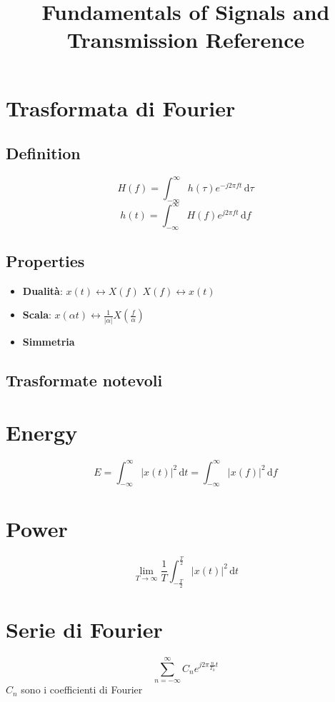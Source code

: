 \documentclass[12pt,a4paper,]{article}
\title{Fundamentals of Signals and Transmission Reference}
\date{}
\author{}
\begin{document}
\maketitle
\section{Trasformata di Fourier}
\subsection{Definition}
\begin{equation}
H(f) = \int_{-\infty}^{\infty} \! h(\tau) e^{-j2\pi ft} \, \mathrm{d}\tau
\end{equation}
\begin{equation}
h(t) = \int_{-\infty}^{\infty} \! H(f) e^{j2\pi ft} \, \mathrm{d}f
\end{equation}
\subsection{Properties}
 \begin{itemize}
 \item  \textbf{Dualità}: $ x(t) \longleftrightarrow X(f)$ $ X(f)\longleftrightarrow x(t)$
 \item \textbf{Scala}: $ x(\alpha t)  \longleftrightarrow \frac{1}{|\alpha|}X(\frac{f}{\alpha})$
 \item \textbf{Simmetria}
  \end{itemize}
 \subsection{Trasformate notevoli}
\section{Energy}
\begin{equation}
E= \int_{-\infty}^{\infty} \! |x(t)|^{2}\, \mathrm{d}t = \int_{-\infty}^{\infty} \! |x(f)|^{2}\, \mathrm{d}f
\end{equation}
\section{Power}
\begin{equation}
\lim_{T\to\infty} \frac{1}{T} \int_{-\frac{T}{2}}^{\frac{T}{2}} \! |x(t)|^{2}\, \mathrm{d}t 
\end{equation}
 
 \section{Serie di Fourier}
 \begin{equation}
 \sum_{n=-\infty}^{\infty}  C_{n} e^{j2\pi\frac{n}{T_{0}}t}
  \end{equation}
  $C_{n}$ sono i coefficienti di Fourier
  
 
 
 
 
 
\end{document}
